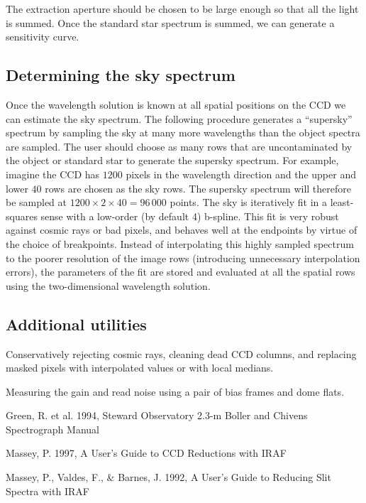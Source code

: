 \documentclass[12pt,preprint]{aastex}
\begin{document}
The extraction aperture should be chosen to be large enough so that
all the light is summed.  Once the standard star spectrum is summed,
we can generate a sensitivity curve.

\subsection{Determining the sky spectrum}

Once the wavelength solution is known at all spatial positions on the
CCD we can estimate the sky spectrum.  The following procedure
generates a ``supersky'' spectrum by sampling the sky at many more
wavelengths than the object spectra are sampled.  The user should
choose as many rows that are uncontaminated by the object or standard
star to generate the supersky spectrum.  For example, imagine the CCD
has $1200$ pixels in the wavelength direction and the upper and lower
$40$ rows are chosen as the sky rows.  The supersky spectrum will
therefore be sampled at $1200\times2\times40=96\,000$ points.  The sky
is iteratively fit in a least-squares sense with a low-order (by
default 4) b-spline.  This fit is very robust against cosmic rays or
bad pixels, and behaves well at the endpoints by virtue of the choice
of breakpoints.  Instead of interpolating this highly sampled spectrum
to the poorer resolution of the image rows (introducing unnecessary
interpolation errors), the parameters of the fit are stored and
evaluated at all the spatial rows using the two-dimensional wavelength
solution.

\subsection{Additional utilities}

Conservatively rejecting cosmic rays, cleaning dead CCD columns, and
replacing masked pixels with interpolated values or with local
medians.

Measuring the gain and read noise using a pair of bias frames and dome
flats.  

\acknowledgments

\begin{references}{}

 Green, R. et al. 1994, Steward Observatory 2.3-m Boller
and Chivens Spectrograph Manual

 Massey, P. 1997, A User's Guide to CCD Reductions with
IRAF

 Massey, P., Valdes, F., \& Barnes, J. 1992, A User's
Guide to Reducing Slit Spectra with IRAF

\end{references}
\end{document}
